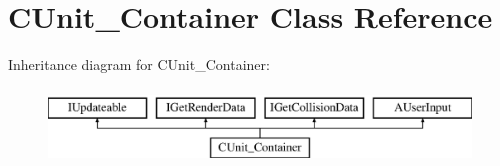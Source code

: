 \hypertarget{classCUnit__Container}{\section{C\-Unit\-\_\-\-Container Class Reference}
\label{classCUnit__Container}
}
Inheritance diagram for C\-Unit\-\_\-\-Container\-:\begin{figure}[H]
\begin{center}
\leavevmode
\includegraphics[height=2.000000cm]{classCUnit__Container}
\end{center}
\end{figure}
